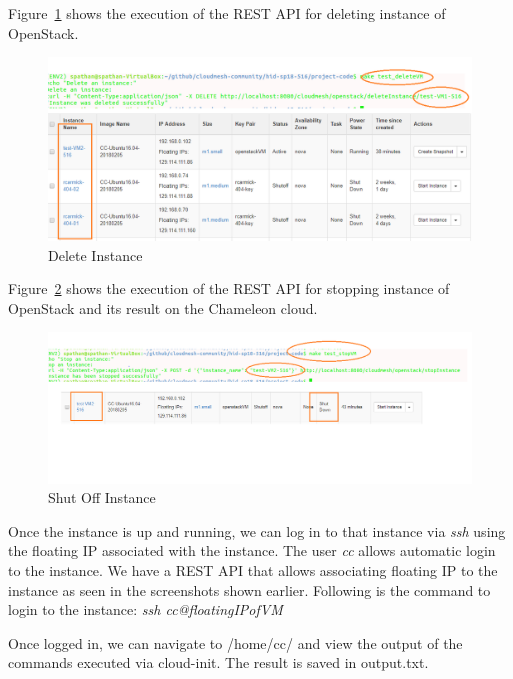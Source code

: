Figure~\ref{fig:deleteVM} shows the execution of the REST API for deleting
instance of OpenStack.
\begin{figure}[!ht]
        \centering\includegraphics[width=\columnwidth]{images/deleteVM.png}
        \caption{Delete Instance}\label{fig:deleteVM}
\end{figure}

Figure~\ref{fig:stopVM} shows the execution of the REST API for stopping
instance of OpenStack and its result on the Chameleon cloud.

\begin{figure}[!ht]
        \centering\includegraphics[width=\columnwidth]{images/stopVM.png}
        \caption{Shut Off Instance}\label{fig:stopVM}
\end{figure}

Once the instance is up and running, we can log in to that instance via
\textit{ssh} using the floating IP associated with the instance. The user
\textit{cc} allows automatic login to the instance. We have a REST API that
allows associating floating IP to the instance as seen in the screenshots shown
earlier. Following is the command to login to the instance:
\textit{ssh cc@floatingIPofVM}

Once logged in, we can navigate to /home/cc/ and view the output of the 
commands executed via cloud-init. The result is saved in output.txt.

